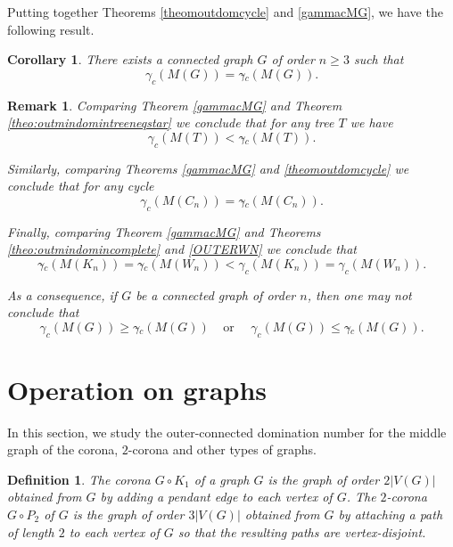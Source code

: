\documentclass[a4paper,12pt, reqno]{amsart}
\newtheorem{Definition}[Theorem]{Definition}
\newtheorem{Corollary}[Theorem]{Corollary}
\newtheorem{Remark}[Theorem]{Remark}
\begin{document}
Putting together Theorems \ref{theomoutdomcycle} and \ref{gammacMG}, we have the following result.
\begin{Corollary}
	There exists a connected graph $G$ of order $n \geq 3$ such that
	$$\gamma _{c}(M(G))=\gamma{\tilde{}} _{c}(M(G)).$$
\end{Corollary}
\begin{Remark}
Comparing Theorem \ref{gammacMG} and Theorem \ref{theo:outmindomintreeneqstar} we conclude that for any tree $T$ we have
$$\gamma _{c}(M(T))<\gamma{\tilde{}} _{c}(M(T)).$$ 

Similarly, comparing Theorems \ref{gammacMG} and \ref{theomoutdomcycle}  we conclude that for any cycle $$\gamma _{c}(M(C_n))=\gamma{\tilde{}} _{c}(M(C_n)).$$

Finally, comparing Theorem \ref{gammacMG} and Theorems \ref{theo:outmindomincomplete} and \ref{OUTERWN} we conclude that $$\gamma{\tilde{}} _{c}(M(K_n))=\gamma{\tilde{}} _{c}(M(W_n))<\gamma _{c}(M(K_n))=\gamma _{c}(M(W_n)).$$ 

As a consequence, if $G$ be a connected graph of order $n$, then one may not conclude that
\[
\gamma _{c}(M(G)) \geq \gamma{\tilde{}} _{c}(M(G))~~~~~\mbox{or}~~~~~~\gamma _{c}(M(G)) \leq \gamma{\tilde{}} _{c}(M(G)).
\]
\end{Remark}



\section{Operation on graphs}

In this section, we study the outer-connected domination number for the middle graph of the corona, $2$-corona and other types of graphs.
\begin{Definition}
	The \emph{corona} $G\circ K_1$ of a graph $G$ is the graph of order $2|V(G)|$ obtained from $G$ by adding a pendant edge to each vertex of $G$. The \emph{$2$-corona} $G\circ P_2$ of $G$ is the graph of order $3|V(G)|$ obtained from $G$ by attaching a path of length $2$ to each vertex of $G$ so that the resulting paths are vertex-disjoint.
\end{Definition}
\end{document}
